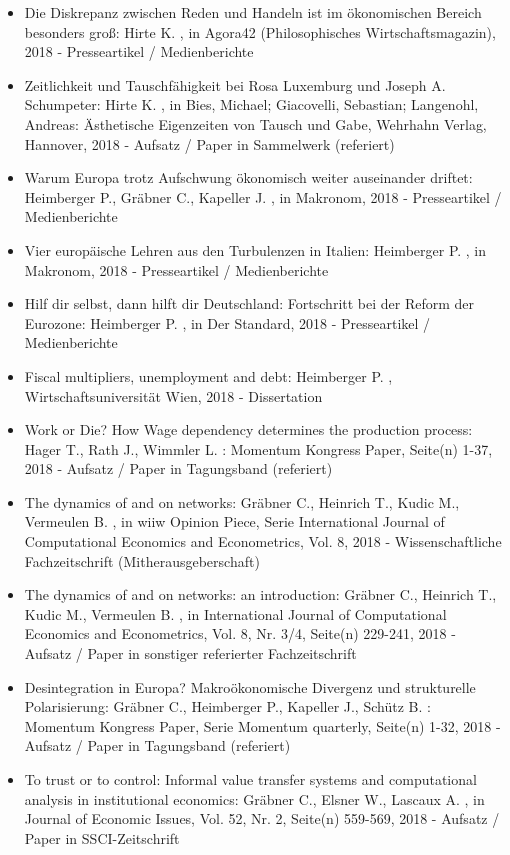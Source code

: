 \begin{itemize}
	 \item Die Diskrepanz zwischen Reden und Handeln ist im ökonomischen Bereich besonders groß: Hirte K. , in Agora42 (Philosophisches Wirtschaftsmagazin), 2018 - Presseartikel / Medienberichte
	 \item Zeitlichkeit und Tauschfähigkeit bei Rosa Luxemburg und Joseph A. Schumpeter: Hirte K. , in Bies, Michael; Giacovelli, Sebastian; Langenohl, Andreas: Ästhetische Eigenzeiten von Tausch und Gabe, Wehrhahn Verlag, Hannover, 2018 - Aufsatz / Paper in Sammelwerk (referiert)
	 \item Warum Europa trotz Aufschwung ökonomisch weiter auseinander driftet: Heimberger P., Gräbner C., Kapeller J. , in Makronom, 2018 - Presseartikel / Medienberichte
	 \item Vier europäische Lehren aus den Turbulenzen in Italien: Heimberger P. , in Makronom, 2018 - Presseartikel / Medienberichte
	 \item Hilf dir selbst, dann hilft dir Deutschland: Fortschritt bei der Reform der Eurozone: Heimberger P. , in Der Standard, 2018 - Presseartikel / Medienberichte
	 \item Fiscal multipliers, unemployment and debt: Heimberger P. , Wirtschaftsuniversität Wien, 2018 - Dissertation
	 \item Work or Die? How Wage dependency determines the production process: Hager T., Rath J., Wimmler L. : Momentum Kongress Paper, Seite(n) 1-37, 2018 - Aufsatz / Paper in Tagungsband (referiert)
	 \item The dynamics of and on networks: Gräbner C., Heinrich T., Kudic M., Vermeulen B. , in wiiw Opinion Piece, Serie International Journal of Computational Economics and Econometrics, Vol. 8, 2018 - Wissenschaftliche Fachzeitschrift (Mitherausgeberschaft)
	 \item The dynamics of and on networks: an introduction: Gräbner C., Heinrich T., Kudic M., Vermeulen B. , in International Journal of Computational Economics and Econometrics, Vol. 8, Nr. 3/4, Seite(n) 229-241, 2018 - Aufsatz / Paper in sonstiger referierter Fachzeitschrift
	 \item Desintegration in Europa? Makroökonomische Divergenz und strukturelle Polarisierung: Gräbner C., Heimberger P., Kapeller J., Schütz B. : Momentum Kongress Paper, Serie Momentum quarterly, Seite(n) 1-32, 2018 - Aufsatz / Paper in Tagungsband (referiert)
	 \item To trust or to control: Informal value transfer systems and computational analysis in institutional economics: Gräbner C., Elsner W., Lascaux A. , in Journal of Economic Issues, Vol. 52, Nr. 2, Seite(n) 559-569, 2018 - Aufsatz / Paper in SSCI-Zeitschrift

\end{itemize}
